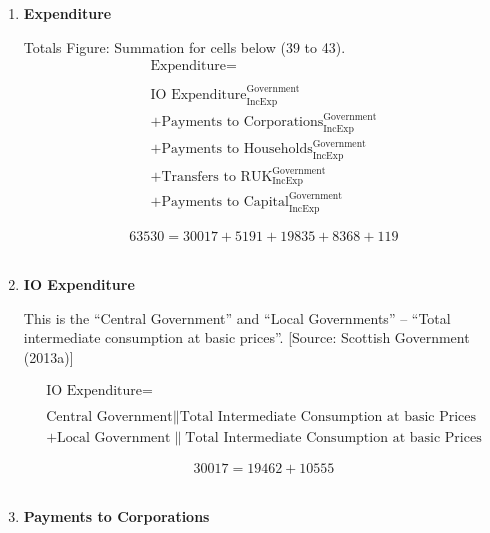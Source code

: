 \begin{enumerate}
\pagebreak

\item \textbf {Expenditure}

Totals Figure: Summation for cells below (39 to 43).\\

\begin{equation}
\begin{split}
\text{Expenditure} =  \\ \\
\text{IO Expenditure}^\text{Government}_\text{IncExp}\\
+\text{Payments to Corporations}^\text{Government}_\text{IncExp}\\
+\text{Payments to Households}^\text{Government}_\text{IncExp}\\
+\text{Transfers to RUK}^\text{Government}_\text{IncExp}\\
+\text{Payments to Capital}^\text{Government}_\text{IncExp}
\end{split} \label{eq:2.5.41}
\end{equation}

\begin{equation} \nonumber
63530 = 30017+5191+19835+8368+119
\end{equation}\\


\item \textbf {IO Expenditure}

This is the “Central Government” and “Local Governments” – “Total intermediate consumption at basic prices”. [Source: Scottish Government (2013a)]

\begin{equation}
\begin{split}
\text{IO Expenditure} =  \\ \\
\text{Central Government}\|\text{Total Intermediate Consumption at basic Prices}\\
+\text{Local Government}\|\text{Total Intermediate Consumption at basic Prices}
\end{split} \label{eq:2.5.42}
\end{equation}

\begin{equation} \nonumber
30017 = 19462+10555
\end{equation}\\


\item \textbf {Payments to  Corporations}


\end{enumerate}
